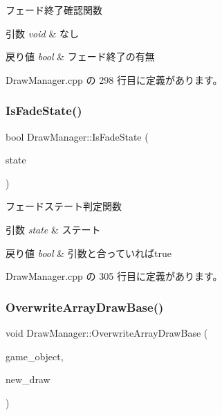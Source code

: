 フェード終了確認関数 


\begin{DoxyParams}{引数}
{\em void} & なし \\
\hline
\end{DoxyParams}

\begin{DoxyRetVals}{戻り値}
{\em bool} & フェード終了の有無 \\
\hline
\end{DoxyRetVals}


 Draw\+Manager.\+cpp の 298 行目に定義があります。

\mbox{\label{class_draw_manager_a4852a5a809e2e067d38e994f0d1650fc}} 
\subsubsection{\texorpdfstring{Is\+Fade\+State()}{IsFadeState()}}
{\footnotesize\ttfamily bool Draw\+Manager\+::\+Is\+Fade\+State (\begin{DoxyParamCaption}\item[{\mbox{\hyperlink{class_fade_ae77826bf3ff2ab95fb7b3b6f95cba80a}{Fade\+::\+State}}}]{state }\end{DoxyParamCaption})}



フェードステート判定関数 


\begin{DoxyParams}{引数}
{\em state} & ステート \\
\hline
\end{DoxyParams}

\begin{DoxyRetVals}{戻り値}
{\em bool} & 引数と合っていればtrue \\
\hline
\end{DoxyRetVals}


 Draw\+Manager.\+cpp の 305 行目に定義があります。

\mbox{\label{class_draw_manager_a94ef5a241c8d78187a2a6c0ed3c9efec}} 
\subsubsection{\texorpdfstring{Overwrite\+Array\+Draw\+Base()}{OverwriteArrayDrawBase()}}
{\footnotesize\ttfamily void Draw\+Manager\+::\+Overwrite\+Array\+Draw\+Base (\begin{DoxyParamCaption}\item[{\mbox{\hyperlink{class_game_object_base}{Game\+Object\+Base}} $\ast$}]{game\+\_\+object,  }\item[{\mbox{\hyperlink{class_draw_base}{Draw\+Base}} $\ast$}]{new\+\_\+draw }\end{DoxyParamCaption})}



